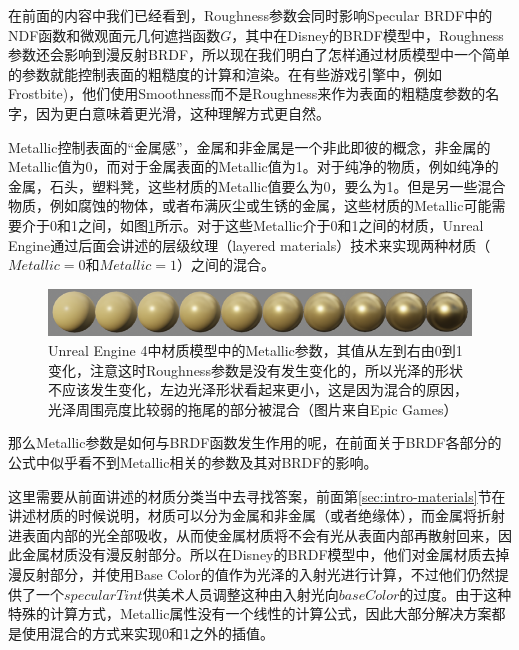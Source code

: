 在前面的内容中我们已经看到，Roughness参数会同时影响Specular BRDF中的NDF函数和微观面元几何遮挡函数$G$，其中在Disney的BRDF模型中，Roughness参数还会影响到漫反射BRDF，所以现在我们明白了怎样通过材质模型中一个简单的参数就能控制表面的粗糙度的计算和渲染。在有些游戏引擎中，例如Frostbite\cite{a:MovingFrostbitetoPBR})，他们使用Smoothness而不是Roughness来作为表面的粗糙度参数的名字，因为更白意味着更光滑，这种理解方式更自然。

Metallic控制表面的“金属感”，金属和非金属是一个非此即彼的概念，非金属的Metallic值为0，而对于金属表面的Metallic值为1。对于纯净的物质，例如纯净的金属，石头，塑料凳，这些材质的Metallic值要么为0，要么为1。但是另一些混合物质，例如腐蚀的物体，或者布满灰尘或生锈的金属，这些材质的Metallic可能需要介于0和1之间，如图\ref{f:intro-ue4-material-metallic}所示。对于这些Metallic介于0和1之间的材质，Unreal Engine通过后面会讲述的层级纹理（layered materials）技术来实现两种材质（$Metallic=0$和$Metallic=1$）之间的混合。

\begin{figure}
\begin{fullwidth}
	\includegraphics[width=1.\thewidth]{graphics/gi/metallic}
\caption{Unreal Engine 4中材质模型中的Metallic参数，其值从左到右由0到1变化，注意这时Roughness参数是没有发生变化的，所以光泽的形状不应该发生变化，左边光泽形状看起来更小，这是因为混合的原因，光泽周围亮度比较弱的拖尾的部分被混合（图片来自Epic Games）}
\label{f:intro-ue4-material-metallic}
\end{fullwidth}
\end{figure}

那么Metallic参数是如何与BRDF函数发生作用的呢，在前面关于BRDF各部分的公式中似乎看不到Metallic相关的参数及其对BRDF的影响。

这里需要从前面讲述的材质分类当中去寻找答案，前面第\ref{sec:intro-materials}节在讲述材质的时候说明，材质可以分为金属和非金属（或者绝缘体），而金属将折射进表面内部的光全部吸收，从而使金属材质将不会有光从表面内部再散射回来，因此金属材质没有漫反射部分。所以在Disney的BRDF模型中，他们对金属材质去掉漫反射部分，并使用Base Color的值作为光泽的入射光进行计算，不过他们仍然提供了一个$specularTint$供美术人员调整这种由入射光向$baseColor$的过度。由于这种特殊的计算方式，Metallic属性没有一个线性的计算公式，因此大部分解决方案都是使用混合的方式来实现0和1之外的插值。

